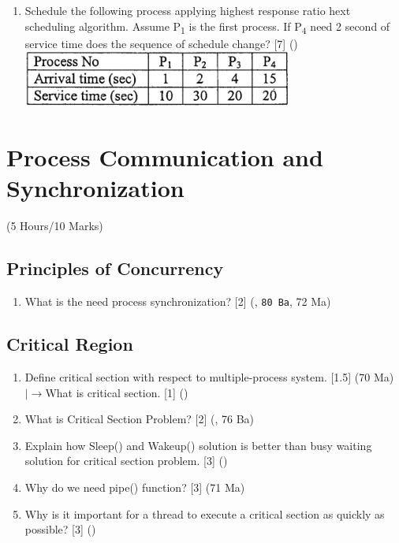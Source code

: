 \documentclass[12pt]{article}
\newcommand{\lb}{\\$\left|\rightarrow\right.$}
\newcommand{\sub}[1]{\textsubscript{#1}}
\begin{document}
\begin{enumerate}
			\item Schedule the following process applying highest response ratio hext scheduling algorithm. Assume P\sub{1} is the first process. If P\sub{4} need 2 second of service time does the sequence of schedule change? \hfill [7] ()\\
			\includegraphics[width=3.5in]{os_24}
		\end{enumerate}

	\pagebreak
\section{Process Communication and Synchronization}
\begin{center}(5 Hours/10 Marks)\end{center}
	\subsection{Principles of Concurrency}
		\begin{enumerate}[noitemsep, topsep=0pt]
			\item What is the need process synchronization? \hfill [2] (, \texttt{80 Ba}, 72 Ma)
		\end{enumerate}
		
	\subsection{Critical Region}
		\begin{enumerate}[noitemsep, topsep=0pt]
			\item Define critical section with respect to multiple-process system. \hfill [1.5] (70 Ma)
			\lb What is critical section. \hfill [1] ()
			
			\item What is Critical Section Problem? \hfill [2] (, 76 Ba)
			
			\item Explain how Sleep() and Wakeup() solution is better than busy waiting solution for critical section problem. \hfill [3] ()
			
			\item Why do we need pipe() function? \hfill [3] (71 Ma)
			
			\item Why is it important for a thread to execute a critical section as quickly as possible? \hfill [3] ()
		\end{enumerate}
		
\end{document}
